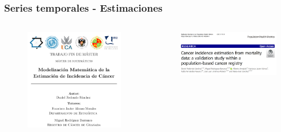 \documentclass{beamer}
\begin{document}

\begin{frame}\frametitle{Series temporales - Estimaciones}
	
	\begin{columns}
		\begin{column}{0.4\textwidth}
			\begin{figure}
				\centering
				\includegraphics[width=\textwidth]{images/tfm_matematicas.png}
			\end{figure}
		\end{column}
		\begin{column}{0.6\textwidth}
			\begin{figure}
				\centering
				\includegraphics[width=\textwidth]{images/tfm_matematicas2.png}
			\end{figure}
		\end{column}
	\end{columns}
	
\end{frame}
\end{document}

